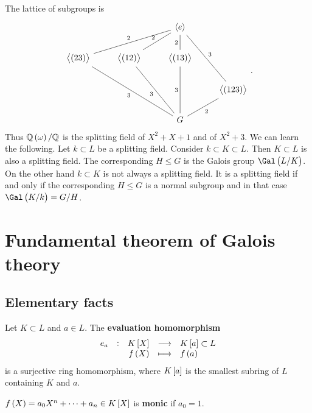 The lattice of subgroups is
$$
\begin{tikzcd}
& & \abr{e} & \\
\abr{\br{23}} \arrow[dash]{urr}{2} & \abr{\br{12}} \arrow[dash]{ur}{2} & \abr{\br{13}} \arrow[dash]{u}{2} & \\
& & & \abr{\br{123}} \arrow[dash, swap]{uul}{3} \\
& & G \arrow[dash]{uull}{3} \arrow[dash]{uul}{3} \arrow[dash]{uu}{3} \arrow[dash, swap]{ur}{2} &
\end{tikzcd}.
$$
Thus $ \QQ\br{\omega} / \QQ $ is the splitting field of $ X^2 + X + 1 $ and of $ X^2 + 3 $. We can learn the following. Let $ k \subset L $ be a splitting field. Consider $ k \subset K \subset L $. Then $ K \subset L $ is also a splitting field. The corresponding $ H \le G $ is the Galois group $ \Gal\br{L / K} $. On the other hand $ k \subset K $ is not always a splitting field. It is a splitting field if and only if the corresponding $ H \le G $ is a normal subgroup and in that case $ \Gal\br{K / k} = G / H $.

\pagebreak

\section{Fundamental theorem of Galois theory}

\subsection{Elementary facts}


Let $ K \subset L $ and $ a \in L $. The \textbf{evaluation homomorphism}
$$ \function[e_a]{K\sbr{X}}{K\sbr{a} \subset L}{f\br{X}}{f\br{a}} $$
is a surjective ring homomorphism, where $ K\sbr{a} $ is the smallest subring of $ L $ containing $ K $ and $ a $.

\begin{definition}
$ f\br{X} = a_0X^n + \dots + a_n \in K\sbr{X} $ is \textbf{monic} if $ a_0 = 1 $.
\end{definition}

